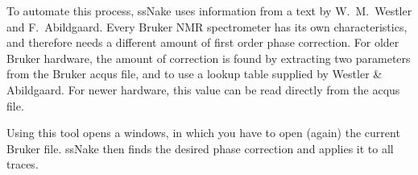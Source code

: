 \documentclass[11pt,a4paper]{article}
\begin{document}

To automate this process, ssNake uses information from a text by W.\ M.\ Westler and F.\ Abildgaard. Every Bruker NMR spectrometer has its own characteristics, and therefore needs a different amount of first order phase correction. For older Bruker hardware, the amount of correction is found by extracting two parameters from the Bruker acqus file, and to use a lookup table supplied by Westler \& Abildgaard. For newer hardware, this value can be read directly from the acqus file.

Using this tool opens a windows, in which you have to open (again) the current Bruker file. ssNake then finds the desired phase correction and applies it to all traces.
\end{document}
